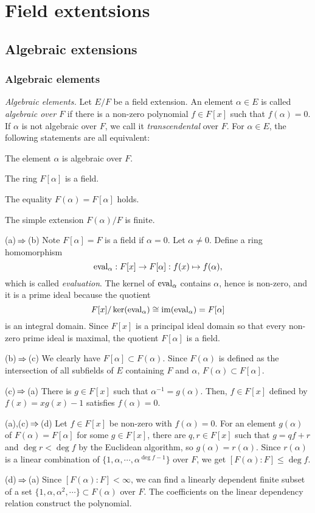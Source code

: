 \documentclass{../note}
\begin{document}
\part{Field extentsions}

\chapter{Algebraic extensions}


\section{Algebraic elements}
\begin{prb}\textit{Algebraic elements.}
Let $E/F$ be a field extension.
An element $\alpha\in E$ is called \emph{algebraic over $F$} if there is a non-zero polynomial $f\in F[x]$ such that $f(\alpha)=0$.
If $\alpha$ is not algebraic over $F$, we call it \emph{transcendental} over $F$.
For $\alpha\in E$, the following statements are all equivalent:
\begin{parts}
\item The element $\alpha$ is algebraic over $F$.
\item The ring $F[\alpha]$ is a field.
\item The equality $F(\alpha)=F[\alpha]$ holds.
\item The simple extension $F(\alpha)/F$ is finite.
\end{parts}
\end{prb}
\begin{pf}
(a)$\impl$(b)
Note $F[\alpha]=F$ is a field if $\alpha=0$.
Let $\alpha\ne0$.
Define a ring homomorphism
\[\operatorname{eval}_\alpha:F[x]\to F[\alpha]:f(x)\mapsto f(\alpha),\]
which is called \emph{evaluation}.
The kernel of $\operatorname{eval}_\alpha$ contains $\alpha$, hence is non-zero, and it is a prime ideal because the quotient
\[F[x]/\ker(\operatorname{eval}_\alpha)\cong\operatorname{im}(\operatorname{eval}_\alpha)=F[\alpha]\]
is an integral domain.
Since $F[x]$ is a principal ideal domain so that every non-zero prime ideal is maximal, the quotient $F[\alpha]$ is a field.

(b)$\impl$(c)
We clearly have $F[\alpha]\subset F(\alpha)$.
Since $F(\alpha)$ is defined as the intersection of all subfields of $E$ containing $F$ and $\alpha$, $F(\alpha)\subset F[\alpha]$.

(c)$\impl$(a)
There is $g\in F[x]$ such that $\alpha^{-1}=g(\alpha)$.
Then, $f\in F[x]$ defined by $f(x)=xg(x)-1$ satisfies $f(\alpha)=0$.

(a),(c)$\impl$(d)
Let $f\in F[x]$ be non-zero with $f(\alpha)=0$.
For an element $g(\alpha)$ of $F(\alpha)=F[\alpha]$ for some $g\in F[x]$, there are $q,r\in F[x]$ such that $g=qf+r$ and $\deg r<\deg f$ by the Euclidean algorithm, so $g(\alpha)=r(\alpha)$.
Since $r(\alpha)$ is a linear combination of $\{1,\alpha,\cdots,\alpha^{\deg f-1}\}$ over $F$, we get $[F(\alpha):F]\le\deg f$.

(d)$\impl$(a)
Since $[F(\alpha):F]<\infty$, we can find a linearly dependent finite subset of a set $\{1,\alpha,\alpha^2,\cdots\}\subset F(\alpha)$ over $F$.
The coefficients on the linear dependency relation construct the polynomial.
\end{pf}
\end{document}
